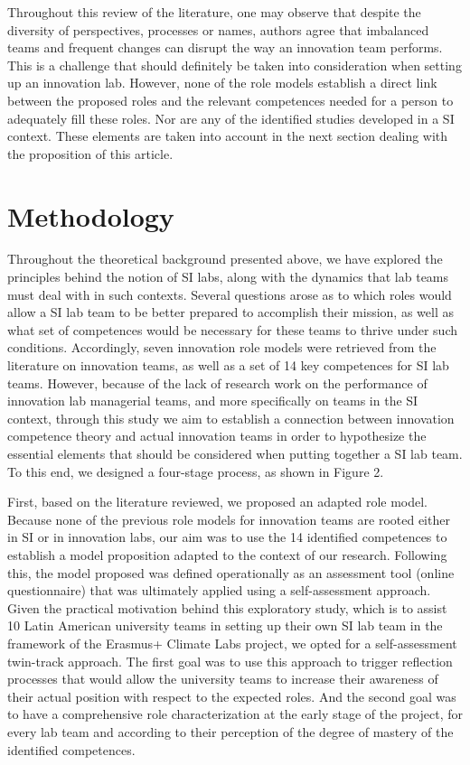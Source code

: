 \documentclass[AMA,STIX1COL,APA,STIX2COL]{WileyNJD-v2}
\begin{document}
Throughout this review of the literature, one may observe that despite
the diversity of perspectives, processes or names, authors agree that
imbalanced teams and frequent changes can disrupt the way an innovation
team performs. This is a challenge that should definitely be taken into
consideration when setting up an innovation lab. However, none of the
role models establish a direct link between the proposed roles and the
relevant competences needed for a person to adequately fill these roles.
Nor are any of the identified studies developed in a SI context. These
elements are taken into account in the next section dealing with the
proposition of this article.

\hypertarget{methodology}{%
\section{Methodology}\label{methodology}}

Throughout the theoretical background presented above, we have explored
the principles behind the notion of SI labs, along with the dynamics
that lab teams must deal with in such contexts. Several questions arose
as to which roles would allow a SI lab team to be better prepared to
accomplish their mission, as well as what set of competences would be
necessary for these teams to thrive under such conditions. Accordingly,
seven innovation role models were retrieved from the literature on
innovation teams, as well as a set of 14 key competences for SI lab
teams. However, because of the lack of research work on the performance
of innovation lab managerial teams, and more specifically on teams in
the SI context, through this study we aim to establish a connection
between innovation competence theory and actual innovation teams in
order to hypothesize the essential elements that should be considered
when putting together a SI lab team. To this end, we designed a
four-stage process, as shown in Figure 2.

First, based on the literature reviewed, we proposed an adapted role
model. Because none of the previous role models for innovation teams are
rooted either in SI or in innovation labs, our aim was to use the 14
identified competences to establish a model proposition adapted to the
context of our research. Following this, the model proposed was defined
operationally as an assessment tool (online questionnaire) that was
ultimately applied using a self-assessment approach. Given the practical
motivation behind this exploratory study, which is to assist 10 Latin
American university teams in setting up their own SI lab team in the
framework of the Erasmus+ Climate Labs project, we opted for a
self-assessment twin-track approach. The first goal was to use this
approach to trigger reflection processes that would allow the university
teams to increase their awareness of their actual position with respect
to the expected roles. And the second goal was to have a comprehensive
role characterization at the early stage of the project, for every lab
team and according to their perception of the degree of mastery of the
identified competences.
\end{document}
